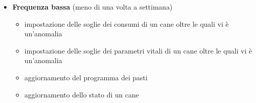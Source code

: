 \begin{itemize}
\begin{itemize}
            \end{itemize}
    \item \textbf{Frequenza bassa} (meno di una volta a settimana)        
        \begin{itemize}
            \item impostazione delle soglie dei consumi di un cane oltre le quali vi è un'anomalia
            \item impostazione delle soglie dei parametri vitali di un cane oltre le quali vi è un'anomalia
            \item aggiornamento del programma dei pasti
            \item aggiornamento dello stato di un cane 
        \end{itemize}
    \end{itemize}
    
